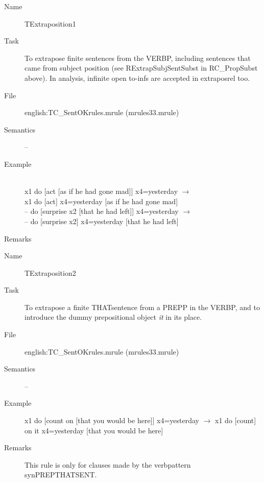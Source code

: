 \begin{description}
\vspace{1 cm}
\begin{description}
\item[Name] TExtraposition1
\item[Task] To extrapose finite sentences from the VERBP, including sentences
that came from subject position (see RExtrapSubjSentSubst in RC\_PropSubst 
above). In 
analysis, infinite open to-infs are accepted in extraposrel too.
 \item[File] english:TC\_SentOKrules.mrule (mrules33.mrule)
\item[Semantics] --
\item[Example] \mbox{}\\
x1 do [act [as if he had gone mad]] x4=yesterday $\rightarrow$ \\
x1 do [act] x4=yesterday [as if he had gone mad] \\
-- do [surprise x2 [that he had left]] x4=yesterday $\rightarrow$ \\
-- do [surprise x2] x4=yesterday [that he had left]
\item[Remarks] 
\end{description}

\vspace{1 cm}
\begin{description}
\item[Name]   TExtraposition2
\item[Task] To extrapose a finite THATsentence from a PREPP in the VERBP, and 
to introduce the dummy prepositional object {\em it\/} in its place.
 \item[File] english:TC\_SentOKrules.mrule (mrules33.mrule)
\item[Semantics] --
\item[Example] x1 do [count on [that you would be here]] x4=yesterday 
$\rightarrow$ x1 do [count] on it x4=yesterday [that you would be here]
\item[Remarks] This rule is only for clauses made by the verbpattern 
synPREPTHATSENT.
\end{description}


\end{description}
